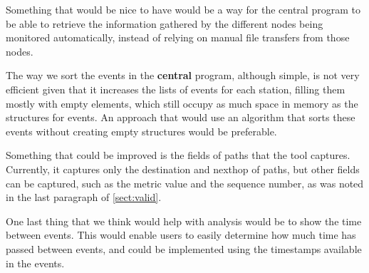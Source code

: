 Something that would be nice to have would be a way for the central program to
be able to retrieve the information gathered by the different nodes being
monitored automatically, instead of relying on manual file transfers from those
nodes.

The way we sort the events in the \textbf{central} program, although simple, is
not very efficient given that it increases the lists of events for each station,
filling them mostly with empty elements, which still occupy as much space in
memory as the structures for events. An approach that would use an algorithm
that sorts these events without creating empty structures would be preferable.

Something that could be improved is the fields of paths that the tool captures.
Currently, it captures only the destination and nexthop of paths, but other
fields can be captured, such as the metric value and the sequence number, as was
noted in the last paragraph of \autoref{sect:valid}.

One last thing that we think would help with analysis would be to show the time
between events. This would enable users to easily determine how much time has
passed between events, and could be implemented using the timestamps available
in the events.
